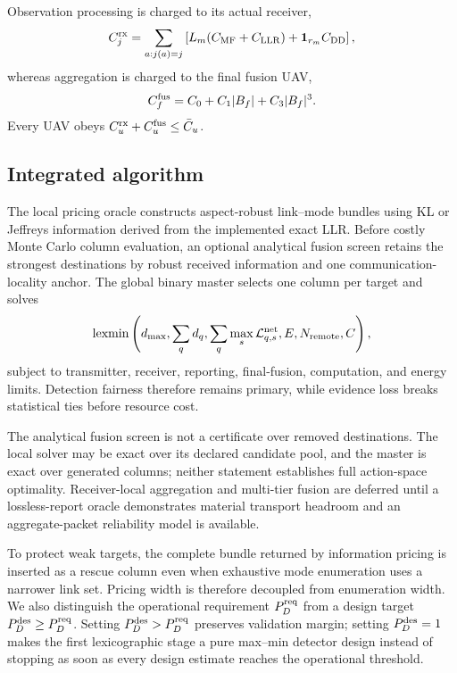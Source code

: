 Observation processing is charged to its actual receiver,
\begin{equation}
C_j^{\rm rx}=\sum_{a:j(a)=j}
\left[L_m(C_{\rm MF}+C_{\rm LLR})+
\mathbf 1_{r_m}C_{\rm DD}\right],
\end{equation}
whereas aggregation is charged to the final fusion UAV,
\begin{equation}
C_f^{\rm fus}=C_0+C_1|B_f|+C_3|B_f|^3.
\end{equation}
Every UAV obeys $C_u^{\rm rx}+C_u^{\rm fus}\le\bar C_u$.

\subsection{Integrated algorithm}

The local pricing oracle constructs aspect-robust link--mode bundles using KL
or Jeffreys information derived from the implemented exact LLR. Before costly
Monte Carlo column evaluation, an optional analytical fusion screen retains
the strongest destinations by robust received information and one
communication-locality anchor. The global binary master selects one column per
target and solves
\begin{equation}
\operatorname{lexmin}\left(d_{\max},\sum_qd_q,
\sum_q\max_s\mathcal L_{q,s}^{\rm net},E,N_{\rm remote},C\right),
\end{equation}
subject to transmitter, receiver, reporting, final-fusion, computation, and
energy limits. Detection fairness therefore remains primary, while evidence
loss breaks statistical ties before resource cost.

The analytical fusion screen is not a certificate over removed destinations.
The local solver may be exact over its declared candidate pool, and the master
is exact over generated columns; neither statement establishes full
action-space optimality. Receiver-local aggregation and multi-tier fusion are
deferred until a lossless-report oracle demonstrates material transport
headroom and an aggregate-packet reliability model is available.

To protect weak targets, the complete bundle returned by information pricing is
inserted as a rescue column even when exhaustive mode enumeration uses a
narrower link set. Pricing width is therefore decoupled from enumeration width.
We also distinguish the operational requirement $P_D^{\rm req}$ from a design
target $P_D^{\rm des}\ge P_D^{\rm req}$. Setting
$P_D^{\rm des}>P_D^{\rm req}$ preserves validation margin; setting
$P_D^{\rm des}=1$ makes the first lexicographic stage a pure max--min detector
design instead of stopping as soon as every design estimate reaches the
operational threshold.

